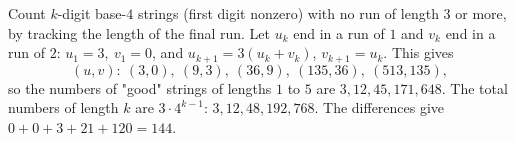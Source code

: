 Count $k$-digit base-$4$ strings (first digit nonzero) with no run of length $3$ or more, by tracking the length of the final run. Let $u_k$ end in a run of $1$ and $v_k$ end in a run of $2$: $u_1=3,\ v_1=0$, and $u_{k+1}=3(u_k+v_k)$, $v_{k+1}=u_k$. This gives
\[(u,v):\ (3,0),\ (9,3),\ (36,9),\ (135,36),\ (513,135),\]
so the numbers of "good" strings of lengths $1$ to $5$ are $3,12,45,171,648$. The total numbers of length $k$ are $3\cdot4^{k-1}$: $3,12,48,192,768$. The differences give $0+0+3+21+120=\boxed{144}$.
